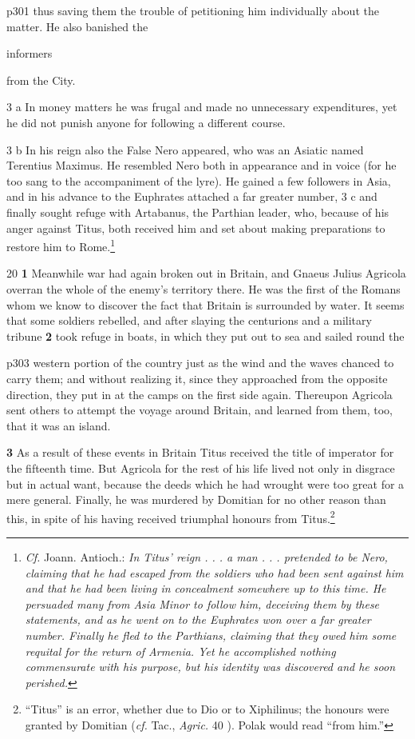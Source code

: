 p301 thus saving them the trouble of petitioning him individually about the matter. He also banished the

informers

from the City.

3 a In money matters he was frugal and made no unnecessary expenditures, yet he did not punish anyone for following a different course.

3 b In his reign also the False Nero appeared, who was an Asiatic named Terentius Maximus. He resembled Nero both in appearance and in voice (for he too sang to the accompaniment of the lyre). He gained a few followers in Asia, and in his advance to the Euphrates attached a far greater number, 3 c and finally sought refuge with Artabanus, the Parthian leader, who, because of his anger against Titus, both received him and set about making preparations to restore him to Rome.\footnote{\emph{Cf.} Joann. Antioch.: \emph{In Titus' reign . . . a man . . . pretended to be Nero, claiming that he had escaped from the soldiers who had been sent against him and that he had been living in concealment somewhere up to this time. He persuaded many from Asia Minor to follow him, deceiving them by these statements, and as he went on to the Euphrates won over a far greater number. Finally he fled to the Parthians, claiming that they owed him some requital for the return of Armenia. Yet he accomplished nothing commensurate with his purpose, but his identity was discovered and he soon perished.}

}

20
\textbf{1} Meanwhile war had again broken out in Britain, and Gnaeus Julius Agricola overran the whole of the enemy's territory there. He was the first of the Romans whom we know to discover the fact that Britain is surrounded by water. It seems that some soldiers rebelled, and after slaying the centurions and a military tribune \textbf{2} took refuge in boats, in which they put out to sea and sailed round the

p303 western portion of the country just as the wind and the waves chanced to carry them; and without realizing it, since they approached from the opposite direction, they put in at the camps on the first side again. Thereupon Agricola sent others to attempt the voyage around Britain, and learned from them, too, that it was an island.

\textbf{3} As a result of these events in Britain Titus received the title of imperator for the fifteenth time. But Agricola for the rest of his life lived not only in disgrace but in actual want, because the deeds which he had wrought were too great for a mere general. Finally, he was murdered by Domitian for no other reason than this, in spite of his having received triumphal honours from Titus.\footnote{``Titus'' is an error, whether due to Dio or to Xiphilinus; the honours were granted by Domitian (\emph{cf.} Tac., \emph{Agric.} 40 ). Polak would read ``from him.''

}

